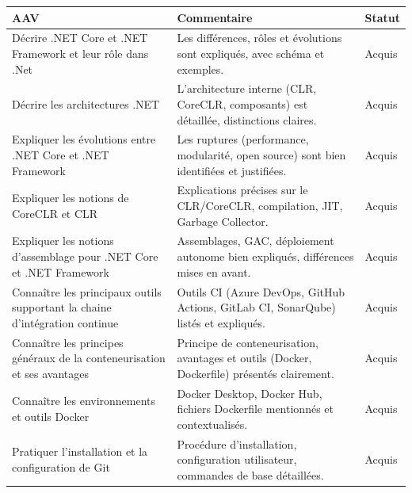\begin{center}
\setlength{\tabcolsep}{10pt}

\begin{tabular}{|p{}|p{}|m{}|}
\hline
\textbf{AAV} & \textbf{Commentaire} & \textbf{Statut} \\ \hline

Décrire .NET Core et .NET Framework et leur rôle dans .Net &
Les différences, rôles et évolutions sont expliqués, avec schéma et exemples. &
{\color{green!60!black}Acquis} \\ \hline

Décrire les architectures .NET &
L'architecture interne (CLR, CoreCLR, composants) est détaillée, distinctions claires. &
{\color{green!60!black}Acquis} \\ \hline

Expliquer les évolutions entre .NET Core et .NET Framework &
Les ruptures (performance, modularité, open source) sont bien identifiées et justifiées. &
{\color{green!60!black}Acquis} \\ \hline

Expliquer les notions de CoreCLR et CLR &
Explications précises sur le CLR/CoreCLR, compilation, JIT, Garbage Collector. &
{\color{green!60!black}Acquis} \\ \hline

Expliquer les notions d'assemblage pour .NET Core et .NET Framework &
Assemblages, GAC, déploiement autonome bien expliqués, différences mises en avant. &
{\color{green!60!black}Acquis} \\ \hline

Connaître les principaux outils supportant la chaine d'intégration continue &
Outils CI (Azure DevOps, GitHub Actions, GitLab CI, SonarQube) listés et expliqués. &
{\color{green!60!black}Acquis} \\ \hline

Connaître les principes généraux de la conteneurisation et ses avantages &
Principe de conteneurisation, avantages et outils (Docker, Dockerfile) présentés clairement. &
{\color{green!60!black}Acquis} \\ \hline

Connaître les environnements et outils Docker &
Docker Desktop, Docker Hub, fichiers Dockerfile mentionnés et contextualisés. &
{\color{green!60!black}Acquis} \\ \hline

Pratiquer l'installation et la configuration de Git &
Procédure d'installation, configuration utilisateur, commandes de base détaillées. &
{\color{green!60!black}Acquis} \\ \hline


\end{tabular}
\end{center}

